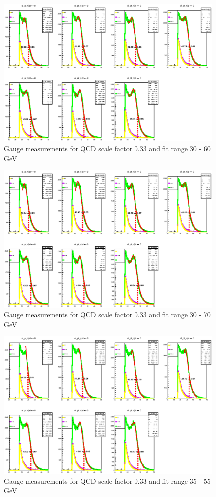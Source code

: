 \begin{figure}
\centering
\includegraphics[width=\textwidth]{data/img/gauge_033_i_30_60.eps}
\caption{Gauge measurements for QCD scale factor 0.33 and fit range 30 - 60 GeV}
\end{figure}
\begin{figure}
\centering
\includegraphics[width=\textwidth]{data/img/gauge_033_i_30_70.eps}
\caption{Gauge measurements for QCD scale factor 0.33 and fit range 30 - 70 GeV}
\end{figure}
\begin{figure}
\centering
\includegraphics[width=\textwidth]{data/img/gauge_033_i_35_55.eps}
\caption{Gauge measurements for QCD scale factor 0.33 and fit range 35 - 55 GeV}
\end{figure}

